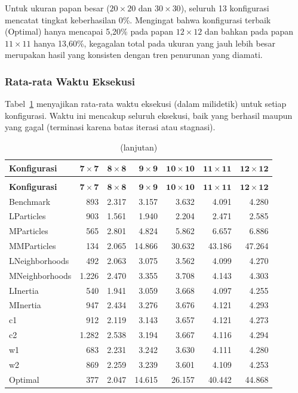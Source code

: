 Untuk ukuran papan besar ($20 \times 20$ dan $30 \times 30$), seluruh 13 konfigurasi mencatat tingkat keberhasilan 0\%. Mengingat bahwa konfigurasi terbaik (Optimal) hanya mencapai 5,20\% pada papan $12 \times 12$ dan bahkan pada papan $11 \times 11$ hanya 13,60\%, kegagalan total pada ukuran yang jauh lebih besar merupakan hasil yang konsisten dengan tren penurunan yang diamati.

\subsubsection{Rata-rata Waktu Eksekusi}

Tabel~\ref{tab:pso-time} menyajikan rata-rata waktu eksekusi (dalam milidetik) untuk setiap konfigurasi. Waktu ini mencakup seluruh eksekusi, baik yang berhasil maupun yang gagal (terminasi karena batas iterasi atau stagnasi).

\begin{longtable}{lrrrrrr}
	\caption{Rata-rata waktu eksekusi PSO (ms) per konfigurasi dan ukuran papan}
	\label{tab:pso-time} \\
	\toprule
	\textbf{Konfigurasi} & $\mathbf{7 \times 7}$ & $\mathbf{8 \times 8}$ & $\mathbf{9 \times 9}$ & $\mathbf{10 \times 10}$ & $\mathbf{11 \times 11}$ & $\mathbf{12 \times 12}$ \\
	\midrule
	\endfirsthead
	\caption[]{(lanjutan)} \\
	\toprule
	\textbf{Konfigurasi} & $\mathbf{7 \times 7}$ & $\mathbf{8 \times 8}$ & $\mathbf{9 \times 9}$ & $\mathbf{10 \times 10}$ & $\mathbf{11 \times 11}$ & $\mathbf{12 \times 12}$ \\
	\midrule
	\endhead
	\bottomrule
	\endfoot
	Benchmark      &    893 &  2.317 &  3.157 &  3.632 &  4.091 &  4.280 \\
	LParticles     &    903 &  1.561 &  1.940 &  2.204 &  2.471 &  2.585 \\
	MParticles     &    565 &  2.801 &  4.824 &  5.862 &  6.657 &  6.886 \\
	MMParticles    &    134 &  2.065 & 14.866 & 30.632 & 43.186 & 47.264 \\
	LNeighborhoods &    492 &  2.063 &  3.075 &  3.562 &  4.099 &  4.270 \\
	MNeighborhoods &  1.226 &  2.470 &  3.355 &  3.708 &  4.143 &  4.303 \\
	LInertia       &    540 &  1.941 &  3.059 &  3.668 &  4.097 &  4.255 \\
	MInertia       &    947 &  2.434 &  3.276 &  3.676 &  4.121 &  4.293 \\
	c1             &    912 &  2.119 &  3.143 &  3.657 &  4.121 &  4.273 \\
	c2             &  1.282 &  2.538 &  3.194 &  3.667 &  4.116 &  4.294 \\
	w1             &    683 &  2.231 &  3.242 &  3.630 &  4.111 &  4.280 \\
	w2             &    869 &  2.259 &  3.239 &  3.601 &  4.109 &  4.253 \\
	Optimal        &    377 &  2.047 & 14.615 & 26.157 & 40.442 & 44.868 \\
\end{longtable}

